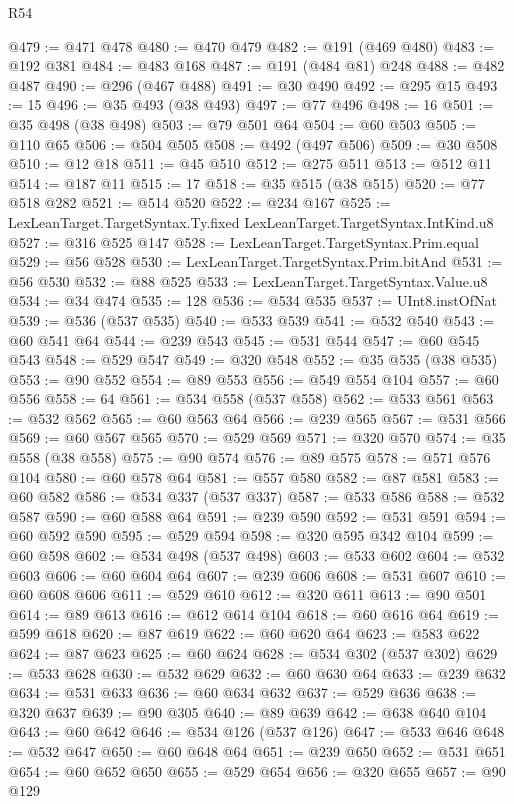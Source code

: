 \begin{lexlean}{R54}
\begin{coremodule}
{{{{{{{{{{{{{{{{{{{{{{{{{{{{{{{{{{{{{{{{{{{{{{{{{{@479 := @471 @478
@480 := @470 @479
@482 := @191 (@469 @480)
@483 := @192 @381
@484 := @483 @168
@487 := @191 (@484 @81) @248
@488 := @482 @487
@490 := @296 (@467 @488)
@491 := @30 @490
@492 := @295 @15
@493 := 15
@496 := @35 @493 (@38 @493)
@497 := @77 @496
@498 := 16
@501 := @35 @498 (@38 @498)
@503 := @79 @501 @64
@504 := @60 @503
@505 := @110 @65
@506 := @504 @505
@508 := @492 (@497 @506)
@509 := @30 @508
@510 := @12 @18
@511 := @45 @510
@512 := @275 @511
@513 := @512 @11
@514 := @187 @11
@515 := 17
@518 := @35 @515 (@38 @515)
@520 := @77 @518 @282
@521 := @514 @520
@522 := @234 @167
@525 := LexLeanTarget.TargetSyntax.Ty.fixed LexLeanTarget.TargetSyntax.IntKind.u8
@527 := @316 @525 @147
@528 := LexLeanTarget.TargetSyntax.Prim.equal
@529 := @56 @528
@530 := LexLeanTarget.TargetSyntax.Prim.bitAnd
@531 := @56 @530
@532 := @88 @525
@533 := LexLeanTarget.TargetSyntax.Value.u8
@534 := @34 @474
@535 := 128
@536 := @534 @535
@537 := UInt8.instOfNat
@539 := @536 (@537 @535)
@540 := @533 @539
@541 := @532 @540
@543 := @60 @541 @64
@544 := @239 @543
@545 := @531 @544
@547 := @60 @545 @543
@548 := @529 @547
@549 := @320 @548
@552 := @35 @535 (@38 @535)
@553 := @90 @552
@554 := @89 @553
@556 := @549 @554 @104
@557 := @60 @556
@558 := 64
@561 := @534 @558 (@537 @558)
@562 := @533 @561
@563 := @532 @562
@565 := @60 @563 @64
@566 := @239 @565
@567 := @531 @566
@569 := @60 @567 @565
@570 := @529 @569
@571 := @320 @570
@574 := @35 @558 (@38 @558)
@575 := @90 @574
@576 := @89 @575
@578 := @571 @576 @104
@580 := @60 @578 @64
@581 := @557 @580
@582 := @87 @581
@583 := @60 @582
@586 := @534 @337 (@537 @337)
@587 := @533 @586
@588 := @532 @587
@590 := @60 @588 @64
@591 := @239 @590
@592 := @531 @591
@594 := @60 @592 @590
@595 := @529 @594
@598 := @320 @595 @342 @104
@599 := @60 @598
@602 := @534 @498 (@537 @498)
@603 := @533 @602
@604 := @532 @603
@606 := @60 @604 @64
@607 := @239 @606
@608 := @531 @607
@610 := @60 @608 @606
@611 := @529 @610
@612 := @320 @611
@613 := @90 @501
@614 := @89 @613
@616 := @612 @614 @104
@618 := @60 @616 @64
@619 := @599 @618
@620 := @87 @619
@622 := @60 @620 @64
@623 := @583 @622
@624 := @87 @623
@625 := @60 @624
@628 := @534 @302 (@537 @302)
@629 := @533 @628
@630 := @532 @629
@632 := @60 @630 @64
@633 := @239 @632
@634 := @531 @633
@636 := @60 @634 @632
@637 := @529 @636
@638 := @320 @637
@639 := @90 @305
@640 := @89 @639
@642 := @638 @640 @104
@643 := @60 @642
@646 := @534 @126 (@537 @126)
@647 := @533 @646
@648 := @532 @647
@650 := @60 @648 @64
@651 := @239 @650
@652 := @531 @651
@654 := @60 @652 @650
@655 := @529 @654
@656 := @320 @655
@657 := @90 @129
}}}}}}}}}}}}}}}}}}}}}}}}}}}}}}}}}}}}}}}}}}}}}}}}}}
\end{coremodule}
\end{lexlean}

